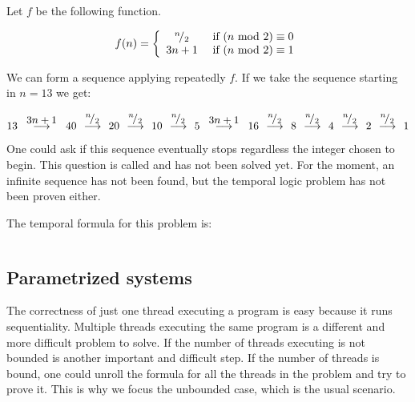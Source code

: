 \begin{example}
\label{Collatz:conjecture}

Let $f$ be the following function.

\[
f(n) = \left\{
	\begin{array}{cc}
		{}^{n}\!/_{2} & \text{ if } (n\text{ mod } 2) \equiv 0\\
		3n+1 & \text{ if } (n\text{ mod } 2) \equiv 1
	\end{array}
\right.
\]

We can form a sequence applying repeatedly $f$. If we take the sequence starting in $n=13$ we get:

\[ 
	13 \overset{\displaystyle\;\; 3n+1\;\;}{\longrightarrow}
	40 \overset{\displaystyle\;\;{}^{n}\!/_{2}\;\;}{\longrightarrow}
	20 \overset{\displaystyle\;\;{}^{n}\!/_{2}\;\;}{\longrightarrow}
	10 \overset{\displaystyle\;\;{}^{n}\!/_{2}\;\;}{\longrightarrow}
	5 \overset{\displaystyle\;\; 3n+1\;\;}{\longrightarrow}
	16 \overset{\displaystyle\;\;{}^{n}\!/_{2}\;\;}{\longrightarrow}
	8 \overset{\displaystyle\;\;{}^{n}\!/_{2}\;\;}{\longrightarrow}
	4 \overset{\displaystyle\;\;{}^{n}\!/_{2}\;\;}{\longrightarrow}
	2 \overset{\displaystyle\;\;{}^{n}\!/_{2}\;\;}{\longrightarrow}
	1
\]

One could ask if this sequence eventually stops regardless the integer chosen to begin. This question is called  and has not been solved yet. 
For the moment, an infinite sequence has not been found, but the temporal logic problem has not been proven either.

The temporal formula for this problem is:

\[

\]


\end{example}


\subsection{Parametrized systems}

The correctness of just one thread executing a program is easy because it runs sequentiality.
%
Multiple threads executing the same program is a different and more difficult problem to solve.
%
If the number of threads executing is not bounded is another important and difficult step.
%
If the number of threads is bound, one could unroll the formula for all the threads in the problem and try to prove it. 
%
This is why we focus the unbounded case, which is the usual scenario.


